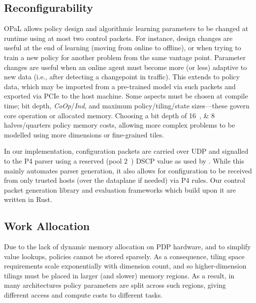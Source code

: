 \documentclass[
sigconf,natbib=false
]{acmart}
\newcommand{\approachshort}{OPaL}
\newcommand{\Coopfw}{\emph{CoOp}}
\newcommand{\Indfw}{\emph{Ind}}
\begin{document}
\subsection{Reconfigurability}
\approachshort{} allows policy design and algorithmic learning parameters to be changed at runtime using at most two control packets.
For instance, design changes are useful at the end of learning (moving from online to offline), or when trying to train a new policy for another problem from the same vantage point.
Parameter changes are useful when an online agent must become more (or less) adaptive to new data (i.e., after detecting a changepoint in traffic).
This extends to policy data, which may be imported from a pre-trained model via such packets and exported via PCIe to the host machine.
Some aspects must be chosen at compile time; bit depth, \Coopfw/\Indfw, and maximum policy/tiling/state sizes---these govern core operation or allocated memory.
Choosing a bit depth of \qtylist[list-pair-separator = { or }]{16;8}{\bit} halves/quarters policy memory costs, allowing more complex problems to be modelled using more dimensions or fine-grained tiles.

In our implementation, configuration packets are carried over UDP and signalled to the P4 parser using a reserved (pool 2~\parencite{rfc2474}) DSCP value as used by \textcite{DBLP:conf/isca/LiLYCSH19}.
While this mainly automates parser generation, it also allows for configuration to be received from only trusted hosts (over the dataplane if needed) via P4 rules.
Our control packet generation library and evaluation frameworks which build upon it are written in Rust.


\subsection{Work Allocation}\label{sec:work-allocation}
Due to the lack of dynamic memory allocation on PDP hardware, and to simplify value lookups, policies cannot be stored sparsely.
As a consequence, tiling space requirements scale exponentially with dimension count, and so higher-dimension tilings must be placed in larger (and slower) memory regions.
As a result, in many architectures policy parameters are split across such regions, giving different access and compute costs to different tasks.
\end{document}
